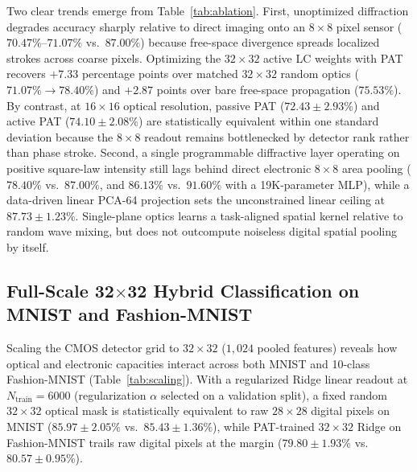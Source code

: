 \documentclass[journal]{IEEEtran}
\begin{document}
Two clear trends emerge from Table~\ref{tab:ablation}. First, unoptimized diffraction degrades accuracy sharply relative to direct imaging onto an $8\times 8$ pixel sensor ($70.47\%$--$71.07\%$ vs.\ $87.00\%$) because free-space divergence spreads localized strokes across coarse pixels. Optimizing the $32\times 32$ active LC weights with PAT recovers $+7.33$ percentage points over matched $32\times 32$ random optics ($71.07\% \to 78.40\%$) and $+2.87$ points over bare free-space propagation ($75.53\%$). By contrast, at $16\times 16$ optical resolution, passive PAT ($72.43 \pm 2.93\%$) and active PAT ($74.10 \pm 2.08\%$) are statistically equivalent within one standard deviation because the $8\times 8$ readout remains bottlenecked by detector rank rather than phase stroke. Second, a single programmable diffractive layer operating on positive square-law intensity still lags behind direct electronic $8\times 8$ area pooling ($78.40\%$ vs.\ $87.00\%$, and $86.13\%$ vs.\ $91.60\%$ with a 19K-parameter MLP), while a data-driven linear PCA-64 projection sets the unconstrained linear ceiling at $87.73 \pm 1.23\%$. Single-plane optics learns a task-aligned spatial kernel relative to random wave mixing, but does not outcompute noiseless digital spatial pooling by itself.

\subsection{Full-Scale 32$\times$32 Hybrid Classification on MNIST and Fashion-MNIST}
Scaling the CMOS detector grid to $32\times 32$ ($1,024$ pooled features) reveals how optical and electronic capacities interact across both MNIST \cite{lecun1998mnist} and 10-class Fashion-MNIST \cite{xiao2017fashion} (Table~\ref{tab:scaling}). With a regularized Ridge linear readout at $N_{\mathrm{train}}=6000$ (regularization $\alpha$ selected on a validation split), a fixed random $32\times 32$ optical mask is statistically equivalent to raw $28\times 28$ digital pixels on MNIST ($85.97 \pm 2.05\%$ vs.\ $85.43 \pm 1.36\%$), while PAT-trained $32\times 32$ Ridge on Fashion-MNIST trails raw digital pixels at the margin ($79.80 \pm 1.93\%$ vs.\ $80.57 \pm 0.95\%$).
\end{document}
